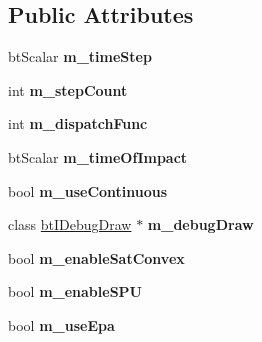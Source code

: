 \subsection*{Public Attributes}
\begin{DoxyCompactItemize}
\item 
\hypertarget{structbt_dispatcher_info_a1c4cac01cd15ada4cd009407816f80f2}{bt\+Scalar {\bfseries m\+\_\+time\+Step}}\label{structbt_dispatcher_info_a1c4cac01cd15ada4cd009407816f80f2}

\item 
\hypertarget{structbt_dispatcher_info_ab02f0a01c5da00dc5a60be58887439d0}{int {\bfseries m\+\_\+step\+Count}}\label{structbt_dispatcher_info_ab02f0a01c5da00dc5a60be58887439d0}

\item 
\hypertarget{structbt_dispatcher_info_a01a2979ceca5903291152e12cffd73e1}{int {\bfseries m\+\_\+dispatch\+Func}}\label{structbt_dispatcher_info_a01a2979ceca5903291152e12cffd73e1}

\item 
\hypertarget{structbt_dispatcher_info_aa4501ea55098cdfd46ed79a59bb5cc0a}{bt\+Scalar {\bfseries m\+\_\+time\+Of\+Impact}}\label{structbt_dispatcher_info_aa4501ea55098cdfd46ed79a59bb5cc0a}

\item 
\hypertarget{structbt_dispatcher_info_ace8ee5a3abf2de5ab913703110190e88}{bool {\bfseries m\+\_\+use\+Continuous}}\label{structbt_dispatcher_info_ace8ee5a3abf2de5ab913703110190e88}

\item 
\hypertarget{structbt_dispatcher_info_afb239bfdc5bb693f94f6f6966e83a6f7}{class \hyperlink{classbt_i_debug_draw}{bt\+I\+Debug\+Draw} $\ast$ {\bfseries m\+\_\+debug\+Draw}}\label{structbt_dispatcher_info_afb239bfdc5bb693f94f6f6966e83a6f7}

\item 
\hypertarget{structbt_dispatcher_info_a8e1f7459054d4ae4aa8930fcb7bc0736}{bool {\bfseries m\+\_\+enable\+Sat\+Convex}}\label{structbt_dispatcher_info_a8e1f7459054d4ae4aa8930fcb7bc0736}

\item 
\hypertarget{structbt_dispatcher_info_af5b2d8b02becb6121fc6e4c9467daa48}{bool {\bfseries m\+\_\+enable\+S\+P\+U}}\label{structbt_dispatcher_info_af5b2d8b02becb6121fc6e4c9467daa48}

\item 
\hypertarget{structbt_dispatcher_info_a84e4b1294ed980dc57db484a5ef8c1d1}{bool {\bfseries m\+\_\+use\+Epa}}\label{structbt_dispatcher_info_a84e4b1294ed980dc57db484a5ef8c1d1}


\end{DoxyCompactItemize}
